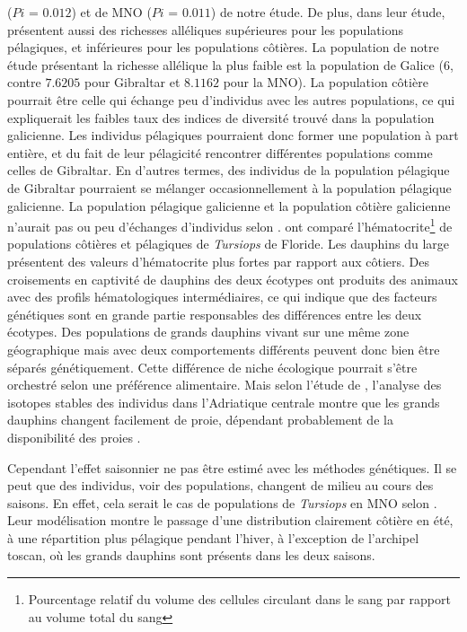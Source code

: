\documentclass[a4paper,12pt,twoside]{article}\usepackage[]{graphicx}\usepackage[]{color}
\begin{document}
($Pi$ = $0.012$) et de MNO ($Pi$ = $0.011$) de notre étude. De plus, dans leur étude, \citet{lowther2014} présentent aussi des richesses alléliques supérieures pour les populations pélagiques, et inférieures pour les populations côtières. La population de notre étude présentant la richesse allélique la plus faible est la population de Galice ($6$, contre $7.6205$ pour Gibraltar et $8.1162$ pour la MNO). La population côtière pourrait être celle qui échange peu d'individus avec les autres populations, ce qui expliquerait les faibles taux des indices de diversité trouvé dans la population galicienne. Les individus pélagiques pourraient donc former une population à part entière, et du fait de leur pélagicité rencontrer différentes populations comme celles de Gibraltar. En d'autres termes, des individus de la population pélagique de Gibraltar pourraient se mélanger occasionnellement à la population pélagique galicienne. La population pélagique galicienne et la population côtière galicienne n'aurait pas ou peu d'échanges d'individus selon \citet{louis2014}. \citep{duffield1983hematology} ont comparé l'hématocrite\footnote{ Pourcentage relatif du volume des cellules circulant dans le sang par rapport au volume total du sang} de populations côtières et pélagiques de \emph{Tursiops} de Floride. Les dauphins du large présentent des valeurs d'hématocrite plus fortes par rapport aux côtiers. Des croisements en captivité de dauphins des deux écotypes ont produits des animaux avec des profils hématologiques intermédiaires, ce qui indique que des facteurs génétiques sont en grande partie responsables des différences entre les deux écotypes. Des populations de grands dauphins vivant sur une même zone géographique mais avec deux comportements différents peuvent donc bien être séparés génétiquement. Cette différence de niche écologique pourrait s'être orchestré selon une préférence alimentaire. Mais selon l'étude de \citet{gaspari2015population}, l'analyse des isotopes stables des individus dans l'Adriatique centrale montre que les grands dauphins changent facilement de proie, dépendant probablement de la disponibilité des proies \citep{holcer2012ecology}.

Cependant l'effet saisonnier ne pas être estimé avec les méthodes génétiques. Il se peut que des individus, voir des populations, changent de milieu au cours des saisons. En effet, cela serait le cas de populations de \emph{Tursiops} en MNO selon \citep{Laran2016}. Leur modélisation montre le passage d'une distribution clairement côtière en été, à une répartition plus pélagique pendant l'hiver, à l'exception de l'archipel toscan, où les grands dauphins sont présents dans les deux saisons.
\end{document}
